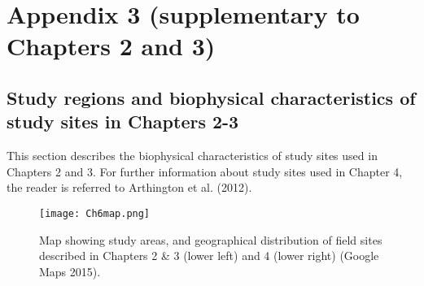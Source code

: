 \documentclass[12pt,a4paper]{memoir}
\begin{document}
\chapter[Appendix 3 (supplementary to Chapters 2 and 3)]{Appendix 3 (supplementary to Chapters 2 and 3)}

\section*{Study regions and biophysical characteristics of study sites in Chapters 2-3}

This section describes the biophysical characteristics of study sites used in Chapters 2 and 3. For further information about study sites used in Chapter 4, the reader is referred to Arthington et al. (2012).

\begin{figure}[ht]
\begin{center}
\texttt{[image: Ch6map.png]} %
\caption[Map of study areas described in Chapters 2-4.]{\small{Map showing study areas, and geographical distribution of field sites described in Chapters 2 \& 3 (lower left) and 4 (lower right) (Google Maps 2015).}\label{fig:Ch6_F1}}
\end{center}
\end{figure}   
\clearpage
\end{document}
